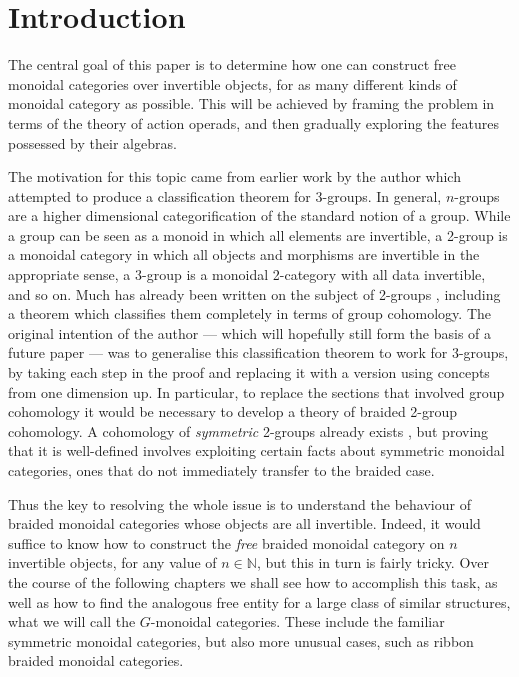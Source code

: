 \chapter{Introduction}
 
The central goal of this paper is to determine how one can construct free monoidal categories over invertible objects, for as many different kinds of monoidal category as possible. This will be achieved by framing the problem in terms of the theory of action operads, and then gradually exploring the features possessed by their algebras.

The motivation for this topic came from earlier work by the author which attempted to produce a classification theorem for 3-groups. In general, $n$-groups are a higher dimensional categorification of the standard notion of a group. While a group can be seen as a monoid in which all elements are invertible, a 2-group is a monoidal category in which all objects and morphisms are invertible in the appropriate sense, a 3-group is a monoidal 2-category with all data invertible, and so on. Much has already been written on the subject of 2-groups \cite{hda5}, including a theorem which classifies them completely in terms of group cohomology. The original intention of the author --- which will hopefully still form the basis of a future paper --- was to generalise this classification theorem to work for 3-groups, by taking each step in the proof and replacing it with a version using concepts from one dimension up. In particular, to replace the sections that involved group cohomology it would be necessary to develop a theory of braided 2-group cohomology. A cohomology of \emph{symmetric} 2-groups already exists \cite{picard}, but proving that it is well-defined involves exploiting certain facts about symmetric monoidal categories, ones that do not immediately transfer to the braided case.   

Thus the key to resolving the whole issue is to understand the behaviour of braided monoidal categories whose objects are all invertible. Indeed, it would suffice to know how to construct the \emph{free} braided monoidal category on $n$ invertible objects, for any value of $n \in \mathbb{N}$, but this in turn is fairly tricky. Over the course of the following chapters we shall see how to accomplish this task, as well as how to find the analogous free entity for a large class of similar structures, what we will call the $G$-monoidal categories. These include the familiar symmetric monoidal categories, but also more unusual cases, such as ribbon braided monoidal categories. 

